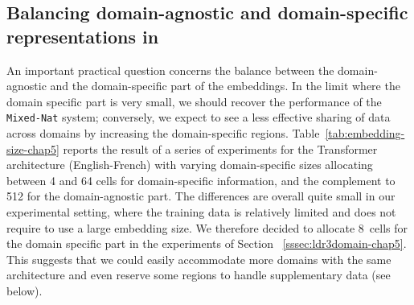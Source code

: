 \subsection{Balancing domain-agnostic and domain-specific representations in \label{secc:region_size-chap5}}
An important practical question concerns the balance between the domain-agnostic and the domain-specific part of the embeddings. 
In the limit where the domain specific part is very small, we should recover the performance of the \texttt{Mixed-Nat} system; 
conversely, we expect to see a less effective sharing of data across domains by increasing the domain-specific regions. 
Table~\ref{tab:embedding-size-chap5} reports the result of  a series of experiments for the Transformer architecture (English-French) with varying domain-specific sizes allocating between 4 and 64 cells for domain-specific information, and the complement to 512 for the domain-agnostic part. 
The differences are overall quite small in our experimental setting, where the training data is relatively limited and does not require to use a large embedding size. 
We therefore decided to allocate $8$~cells for the domain specific part in the experiments of Section ~\ref{sssec:ldr3domain-chap5}. 
This suggests that we could easily accommodate more domains with the same architecture and even reserve some regions to handle supplementary data (see below). %

\begin{table}[!h]
\begin{center}
\end{center}
\caption{BLEU scores for the Transformer architecture for varying domain-specific embedding sizes \label{tab:embedding-size-chap5}}
\end{table}

